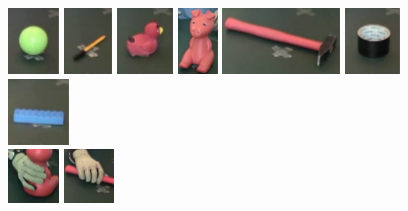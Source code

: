 \begin{figure}[tb]
	\centering
	\includegraphics[height=1.75cm]{images/objects/palla}
	\includegraphics[height=1.75cm]{images/objects/penna}
	\includegraphics[height=1.75cm]{images/objects/papera}
	\includegraphics[height=1.75cm]{images/objects/porcellino}
	\includegraphics[height=1.75cm]{images/objects/martello}
	\includegraphics[height=1.75cm]{images/objects/scotch}
	\includegraphics[height=1.75cm]{images/objects/lego}\\
	\vskip 0.1cm
	\includegraphics[width=0.12\textwidth]{images/objects/cylinder}
	\includegraphics[width=0.12\textwidth]{images/objects/flat}

\end{figure}
